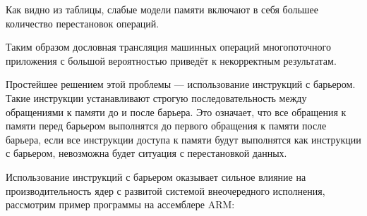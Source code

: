 Как видно из таблицы, слабые модели памяти включают в себя большее количество перестановок операций. 

Таким образом дословная трансляция машинных операций многопоточного приложения с большой вероятностью приведёт к некорректным результатам. 

Простейшее решением этой проблемы --- использование инструкций с барьером. Такие инструкции устанавливают строгую последовательность между обращениями к памяти до и после барьера. Это означает, что все обращения к памяти перед барьером выполнятся до первого обращения к памяти после барьера, если все инструкции доступа к памяти будут выполнятся как инструкции с барьером, невозможна будет ситуация с перестановкой данных.

Использование инструкций с барьером оказывает сильное влияние на производительность ядер с развитой системой внеочередного исполнения, рассмотрим пример программы на ассемблере ARM:

